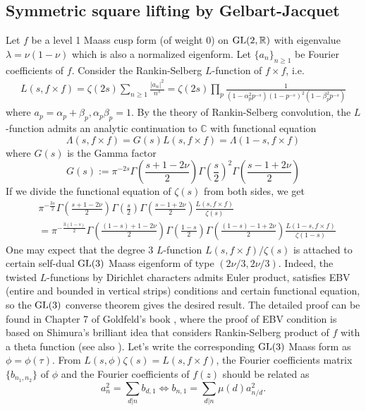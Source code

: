 \subsection{Symmetric square lifting by Gelbart-Jacquet}

Let $f$ be a level 1 Maass cusp form (of weight 0) on $\operatorname{\mathrm{GL}}(2,\mathbb{R})$ with eigenvalue $\lambda = \nu(1-\nu)$ which is also a normalized eigenform.
Let $\{a_{n}\}_{n\geq 1}$ be Fourier coefficients of $f$.
Consider the Rankin-Selberg $L$-function of $f \times f$, i.e.
\begin{align*}
L(s, f \times f) = \zeta(2s)\sum_{n\geq 1} \frac{|a_{n}|^{2}}{n^{s}}
= \zeta(2s)\prod_{p}  \frac{1}{(1-\alpha_{p}^{2}p^{-s})(1-p^{-s})^{2}(1-\beta_{p}^{2}p^{-s})}
\end{align*}
where $a_{p} = \alpha_{p} + \beta_{p}, \alpha_{p}\beta_{p} =1$.
By the theory of Rankin-Selberg convolution, the $L$-function admits an analytic continuation to $\mathbb{C}$ with functional equation
$$
\Lambda(s, f \times f) = G(s)L(s, f\times f) = \Lambda(1-s, f\times f)
$$
where $G(s)$ is the Gamma factor
$$
G(s) := \pi^{-2s}\Gamma\left(\frac{s + 1 - 2\nu}{2}\right)\Gamma\left(\frac{s}{2}\right)^{2} \Gamma\left(\frac{s - 1 + 2\nu}{2}\right)
$$
If we divide the functional equation of $\zeta(s)$ from both sides, we get
\begin{align*}
    &\pi^{-\frac{3s}{2}} \Gamma\left(\frac{s + 1 - 2\nu}{2}\right)\Gamma\left(\frac{s}{2}\right) \Gamma\left(\frac{s - 1 + 2\nu}{2}\right) \frac{L(s, f\times f)}{\zeta(s)} \\
    &=\pi^{-\frac{3(1-s)}{2}} \Gamma\left(\frac{(1-s) + 1 - 2\nu}{2}\right)\Gamma\left(\frac{1-s}{2}\right) \Gamma\left(\frac{(1-s) - 1 + 2\nu}{2}\right) \frac{L(1-s, f\times f)}{\zeta(1-s)}
\end{align*}
One may expect that the degree 3 $L$-function $L(s, f\times f) / \zeta(s)$ is attached to certain self-dual $\operatorname{\mathrm{GL}}(3)$ Maass eigenform of type $(2\nu/3, 2\nu/3)$.
Indeed, the twisted $L$-functions by Dirichlet characters admits Euler product, satisfies EBV (entire and bounded in vertical strips) conditions and certain functional equation, 
so the $\operatorname{\mathrm{GL}}(3)$ converse theorem gives the desired result.
The detailed proof can be found in Chapter 7 of Goldfeld's book \cite{goldfeld2006automorphic},
where the proof of EBV condition is based on Shimura's brilliant idea that considers Rankin-Selberg product of $f$ 
with a theta function (see also \cite{shimura1975holomorphy}).
Let's write the corresponding $\operatorname{\mathrm{GL}}(3)$ Maass form as $\phi = \phi(\tau)$.
From $L(s, \phi)\zeta(s) = L(s, f\times f)$, the Fourier coefficients matrix $\{b_{n_{1}, n_{2}}\}$ of $\phi$ and the Fourier coefficients of $f(z)$ should be related as
$$
a_{n}^{2} = \sum_{d|n} b_{d, 1} \Longleftrightarrow b_{n, 1} = \sum_{d|n} \mu(d) a_{n/d}^{2}.
$$

